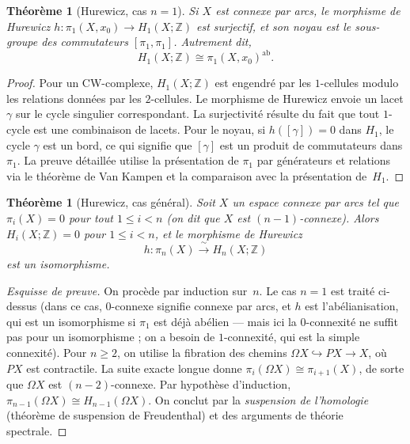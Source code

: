 \documentclass[12pt,a4paper,openany]{book}
\theoremstyle{definition}
\theoremstyle{plain}
\newtheorem{theoreme}[definition]{Théorème}
\theoremstyle{remark}
\newcommand{\Z}{\mathbb{Z}}
\begin{document}
\begin{theoreme}[Hurewicz, cas $n = 1$]\label{thm:hurewicz-n1}
  Si $X$ est connexe par arcs, le morphisme de Hurewicz
  $h \colon \pi_1(X, x_0) \to H_1(X; \Z)$
  est surjectif, et son noyau est le sous-groupe des commutateurs
  $[\pi_1, \pi_1]$. Autrement dit,
  \[
    H_1(X; \Z) \cong \pi_1(X, x_0)^{\mathrm{ab}}.
  \]
\end{theoreme}

\begin{proof}
  Pour un CW-complexe, $H_1(X; \Z)$ est engendré par les $1$-cellules modulo les
  relations données par les $2$-cellules. Le morphisme de Hurewicz envoie un lacet
  $\gamma$ sur le cycle singulier correspondant. La surjectivité résulte du fait que
  tout $1$-cycle est une combinaison de lacets. Pour le noyau, si $h([\gamma]) = 0$
  dans $H_1$, le cycle $\gamma$ est un bord, ce qui signifie que $[\gamma]$ est
  un produit de commutateurs dans $\pi_1$. La preuve détaillée utilise la
  présentation de $\pi_1$ par générateurs et relations via le théorème de
  Van Kampen et la comparaison avec la présentation de~$H_1$.
\end{proof}

\begin{theoreme}[Hurewicz, cas général]\label{thm:hurewicz-general}
  Soit $X$ un espace connexe par arcs tel que $\pi_i(X) = 0$ pour tout $1 \leq i < n$
  (on dit que $X$ est \emph{$(n{-}1)$-connexe}). Alors
  $H_i(X; \Z) = 0$ pour $1 \leq i < n$, et le morphisme de Hurewicz
  \[
    h \colon \pi_n(X) \xrightarrow{\;\sim\;} H_n(X; \Z)
  \]
  est un isomorphisme.
\end{theoreme}

\begin{proof}[Esquisse de preuve]
  On procède par induction sur~$n$. Le cas $n = 1$ est traité ci-dessus (dans ce
  cas, $0$-connexe signifie connexe par arcs, et $h$ est l'abélianisation, qui est
  un isomorphisme si $\pi_1$ est déjà abélien --- mais ici la $0$-connexité ne
  suffit pas pour un isomorphisme ; on a besoin de $1$-connexité, qui est la
  simple connexité). Pour $n \geq 2$, on utilise la fibration des chemins
  $\Omega X \hookrightarrow PX \to X$, où $PX$ est contractile. La suite exacte
  longue donne $\pi_i(\Omega X) \cong \pi_{i+1}(X)$, de sorte que $\Omega X$ est
  $(n{-}2)$-connexe. Par hypothèse d'induction,
  $\pi_{n-1}(\Omega X) \cong H_{n-1}(\Omega X)$. On conclut par la
  \emph{suspension de l'homologie} (théorème de suspension de Freudenthal) et des
  arguments de théorie spectrale.
\end{proof}
\end{document}
